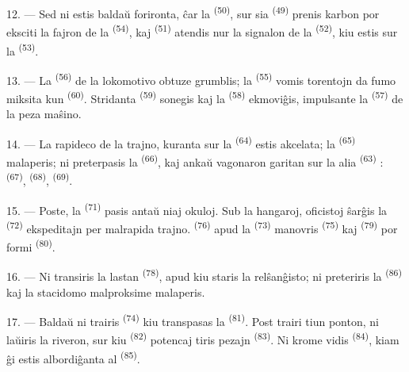 12. --- Sed ni estis baldaŭ forironta, ĉar la 
\textsuperscript{(50)}, sur sia  \textsuperscript{(49)} prenis
karbon por eksciti la fajron de la  \textsuperscript{(54)},
kaj  \textsuperscript{(51)} atendis nur la signalon de la
 \textsuperscript{(52)}, kiu estis sur la
 \textsuperscript{(53)}.

13. --- La  \textsuperscript{(56)} de la lokomotivo obtuze
grumblis; la  \textsuperscript{(55)} vomis torentojn da fumo
miksita kun  \textsuperscript{(60)}. Stridanta 
\textsuperscript{(59)} sonegis kaj la  \textsuperscript{(58)}
ekmoviĝis, impulsante la  \textsuperscript{(57)} de la peza
maŝino.

\VUsaut{3.0mm}
\VUsaut{3.0mm}

14. --- La rapideco de la trajno, kuranta sur la 
\textsuperscript{(64)} estis akcelata; la 
\textsuperscript{(65)} malaperis; ni preterpasis la 
\textsuperscript{(66)}, kaj ankaŭ vagonaron garitan sur la alia 
\textsuperscript{(63)} :  \textsuperscript{(67)},
 \textsuperscript{(68)}, 
\textsuperscript{(69)}.


15. --- Poste, la  \textsuperscript{(71)} pasis
antaŭ niaj okuloj. Sub la hangaroj, oficistoj ŝarĝis la 
\textsuperscript{(72)} ekspeditajn per malrapida trajno. 
\textsuperscript{(76)} apud la  \textsuperscript{(73)}
manovris  \textsuperscript{(75)} kaj  \textsuperscript{(79)} por formi 
\textsuperscript{(80)}.

16. --- Ni transiris la lastan  \textsuperscript{(78)},
apud kiu staris la relŝanĝisto; ni preteriris la 
\textsuperscript{(86)} kaj la stacidomo malproksime malaperis.

17. --- Baldaŭ ni trairis  \textsuperscript{(74)} kiu
transpasas la  \textsuperscript{(81)}. Post trairi tiun ponton,
ni laŭiris la riveron, sur kiu  \textsuperscript{(82)}
potencaj tiris pezajn  \textsuperscript{(83)}. Ni krome
vidis  \textsuperscript{(84)}, kiam ĝi estis albordiĝanta al
 \textsuperscript{(85)}.

